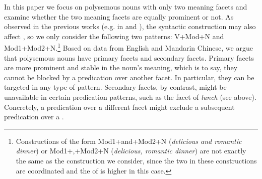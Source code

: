 \documentclass[output=paper,colorlinks,citecolor=brown,chinesefont]{langscibook}
\begin{document}
\ea \label{ex:introdinner:Chen}
 \label{ex:orgdeldin:Chen}
 \label{ex:orderquickdinner:Chen}
 \label{ex:orderslowdinner:Chen}
\z\z

In this paper we focus on polysemous nouns with only two meaning facets and examine whether the two meaning facets are equally prominent or not. As observed in the previous works (e.g. in \citealt{chatzikyriakidis2015individuation} and \citealt{jezek2011nominals}), the syntactic construction may also affect  , so we only consider the following two  patterns: V+Mod+N and Mod1+Mod2+N.\footnote{Constructions of the form Mod1+and+Mod2+N (\emph{delicious and romantic dinner}) or Mod1+,+Mod2+N (\emph{delicious, romantic dinner}) are not exactly the same as the construction we consider, since the two  in these constructions are coordinated and the  of  is higher in this case.}
Based on data from English and Mandarin Chinese, we argue that polysemous nouns have primary facets and secondary facets. Primary facets are more prominent and stable in the noun's meaning, which is to say, they cannot be blocked by a predication over another facet.
In particular, they can be targeted in any type of  pattern.
Secondary facets, by contrast, might be unavailable in certain predication patterns, such as the  facet of \emph{lunch} (see above). Concretely, a predication over a different facet might exclude a subsequent predication over a .
 
\end{document}
